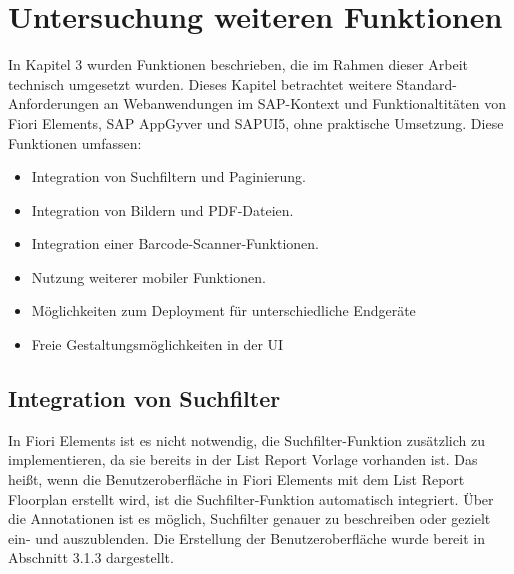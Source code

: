 
\chapter{Untersuchung weiteren Funktionen} \label{UF}

In Kapitel 3 wurden Funktionen beschrieben, die im Rahmen dieser Arbeit technisch umgesetzt wurden. Dieses Kapitel betrachtet weitere Standard-Anforderungen  an Webanwendungen im SAP-Kontext und Funktionaltitäten von Fiori Elements, SAP AppGyver und SAPUI5, ohne praktische Umsetzung. Diese Funktionen umfassen: 

\begin{itemize}[noitemsep]
\item Integration von Suchfiltern und Paginierung. 
\item Integration von Bildern und PDF-Dateien.
\item Integration einer Barcode-Scanner-Funktionen.
\item Nutzung weiterer mobiler Funktionen. 
\item Möglichkeiten zum Deployment für unterschiedliche Endgeräte
\item Freie Gestaltungsmöglichkeiten in der UI
\end{itemize}

\section{Integration von Suchfilter}

In Fiori Elements ist es nicht notwendig, die Suchfilter-Funktion zusätzlich zu implementieren, da sie bereits in der List Report Vorlage vorhanden ist. Das heißt, wenn die Benutzeroberfläche in Fiori Elements mit dem List Report Floorplan erstellt wird, ist die Suchfilter-Funktion automatisch integriert. Über die Annotationen ist es möglich, Suchfilter genauer zu beschreiben oder gezielt ein- und auszublenden. Die Erstellung der Benutzeroberfläche wurde bereit in Abschnitt 3.1.3 dargestellt.

